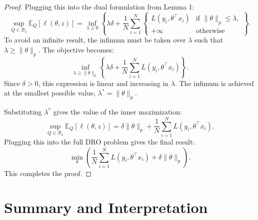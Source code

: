 \documentclass[12pt]{report}
\begin{document}
\begin{proof}
Plugging this into the dual formulation from Lemma 1:
\[
\sup_{Q \in \mathcal{B}_\delta} \mathbb{E}_Q[\ell(\theta, z)] = \inf_{\lambda \ge 0} \left\{ \lambda\delta + \frac{1}{N}\sum_{i=1}^N \begin{cases} L(y_i, \theta^\top x_i) & \text{if } \|\theta\|_p \le \lambda, \\ +\infty & \text{otherwise} \end{cases} \right\}.
\]
To avoid an infinite result, the infimum must be taken over $\lambda$ such that $\lambda \ge \|\theta\|_p$. The objective becomes:
\[
\inf_{\lambda \ge \|\theta\|_p} \left\{\lambda\delta + \frac{1}{N}\sum_{i=1}^N L(y_i, \theta^\top x_i)\right\}.
\]
Since $\delta > 0$, this expression is linear and increasing in $\lambda$. The infimum is achieved at the smallest possible value, $\lambda^* = \|\theta\|_p$.

Substituting $\lambda^*$ gives the value of the inner maximization:
\[
\sup_{Q \in \mathcal{B}_\delta} \mathbb{E}_Q[\ell(\theta, z)] = \delta \|\theta\|_p + \frac{1}{N}\sum_{i=1}^N L(y_i, \theta^\top x_i).
\]
Plugging this into the full DRO problem gives the final result:
\[
\min_\theta \left( \frac{1}{N}\sum_{i=1}^N L(y_i, \theta^\top x_i) + \delta \|\theta\|_p \right).
\]
This completes the proof.
\end{proof}

\section{Summary and Interpretation}
\end{document}

